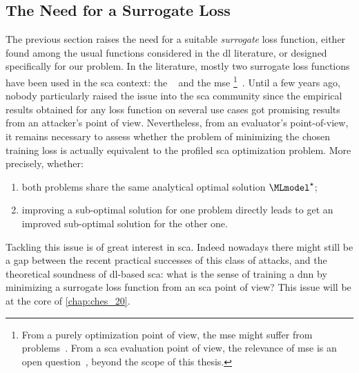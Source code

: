 \subsection{The Need for a Surrogate Loss}
\label{sec:surrogate_loss}
The previous section raises the need for a suitable \emph{surrogate} loss function, either found among the usual functions considered in the \gls{dl} literature, or designed specifically for our problem.
In the literature, mostly two surrogate loss functions have been used in the \gls{sca} context: the ~\cite{cagli_convolutional_2017,prouff_study_2018,kim_make_2019} and the \gls{mse}%
\footnote{
	From a purely optimization point of view, the \gls{mse} might suffer from problems~\cite{nielsen_neural_2018}.
	From a \gls{sca} evaluation point of view, the relevance of \gls{mse} is an open question~\cite{picek_bias_2019}, beyond the scope of this thesis.
}~\cite{maghrebi_breaking_2016, timon_non-profiled_2019,wegener_dlla_2019}.
Until a few years ago, nobody particularly raised the issue into the \gls{sca} community since the empirical results obtained for any loss function on several use cases got promising results from an attacker's point of view.
Nevertheless, from an evaluator's point-of-view, it remains necessary to assess whether the problem of minimizing the chosen training loss is actually equivalent to the profiled \gls{sca} optimization problem.
More precisely, whether:
\begin{enumerate}
	\item both problems share the same analytical optimal solution \(\MLmodel^\star\);
	\item improving a sub-optimal solution for one problem directly leads to get an improved sub-optimal solution for the other one.
\end{enumerate}
Tackling this issue is of great interest in \gls{sca}.
Indeed nowadays there might still be a gap between the recent practical successes of this class of attacks, and the theoretical soundness of \gls{dl}-based \gls{sca}: what is the sense of training a \gls{dnn} by minimizing a surrogate loss function from an \gls{sca} point of view?
This issue will be at the core of \autoref{chap:ches_20}.

